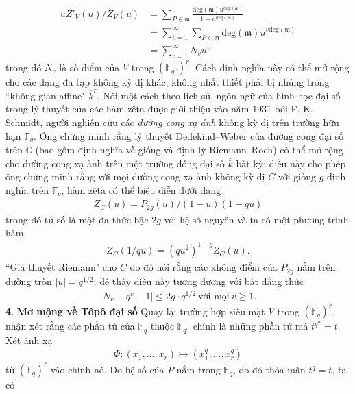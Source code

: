 \begin{multicols}{2}
	\begin{align*}
			uZ'_V(u)/Z_V(u) & = \sum_{P \in \mathfrak{m}} \frac{\mathrm{deg}(\mathfrak{m}) u^{\mathrm{deg}(\mathfrak{m})}}{1 - u^{\mathrm{deg}(\mathfrak{m})}} \\ 
			& = \sum_{v=1}^{\infty} \sum_{P \in \mathfrak{m}} \mathrm{deg}(\mathfrak{m}) u^{v\mathrm{deg}(\mathfrak{m})} \\
			&= \sum_{v=1}^{\infty} N_v u^v\tag{$9$}
	\end{align*}
	trong đó $N_v$ là số điểm của $V$ trong $(\mathbb{F}_{q^v})^r$.  
	\vskip 0.1cm
	Cách định nghĩa này có thể mở rộng cho các dạng đa tạp không kỳ dị khác, không nhất thiết phải bị nhúng trong ``không gian affine" $\overline{k}^r$. Nói một cách theo lịch sử, ngôn ngữ của hình học đại số trong lý thuyết của các hàm zêta được giới thiệu vào năm $1931$ bởi F. K. Schmidt, người nghiên cứu các \textit{đường cong xạ ảnh} không kỳ dị trên trường hữu hạn $\mathbb{F}_q$. Ông chứng minh rằng lý thuyết Dedekind--Weber của đường cong đại số trên $\mathbb{C}$ (bao gồm định nghĩa về giống và định lý Riemann--Roch) có thể mở rộng cho đường cong xạ ảnh trên một trường đóng đại số $\overline{k}$ bất kỳ; điều này cho phép ông chứng minh rằng với mọi đường cong xạ ảnh không kỳ dị $C$ với giống $g$ định nghĩa trên $\mathbb{F}_q$, hàm zêta có thể biểu diễn dưới dạng
	\begin{align*} 
		Z_C(u) = P_{2g}(u)/(1-u)(1-qu) \tag{$10$}
	\end{align*}
	trong đó tử số là một đa thức bậc $2g$ với hệ số nguyên và ta có một phương trình hàm
	\begin{align*} 
		Z_C(1/qu) = (qu^2)^{1-g}Z_C(u). \tag{$11$}
	\end{align*}
	``Giả thuyết Riemann" cho $C$ do đó nói rằng các không điểm của $P_{2g}$ nằm trên đường tròn $\left|u \right|=q^{1/2}$; dễ thấy điều này tương đương với bất đẳng thức
	\begin{align*} 
		\left|N_v \!-\! q^v\!-\! 1\right| \!\leq\! 2g \!\cdot\! q^{1/2} \ \text{với mọi} \ v \geq 1. \tag{$12$}
	\end{align*}
	$\pmb{4.}$ \textbf{\color{duongvaotoanhoc}Mơ mộng về Tôpô đại số}
	\vskip 0.1cm
	Quay lại trường hợp siêu mặt $V$ trong $(\overline{\mathbb{F}}_q)^r$, nhận xét rằng các phần tử của $\overline{\mathbb{F}}_q$ thuộc $\mathbb{F}_{q^n}$ chính là những phần tử mà $t^{q^n}=t$. Xét ánh xạ
	\begin{align*}
		\Phi: (x_1,...,x_r) \mapsto (x_1^{q},...,x_r^q)
	\end{align*}
	từ $(\overline{\mathbb{F}}_q)^r$ vào chính nó. Do hệ số của $P$ nằm trong $\mathbb{F}_q$, do đó thỏa mãn $t^q = t$, ta có

\end{multicols}
